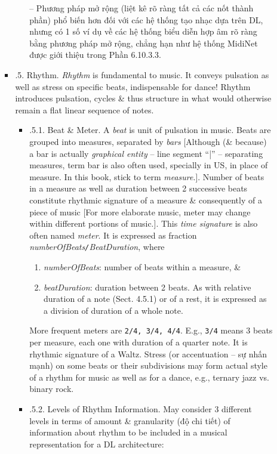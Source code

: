 \documentclass{article}
\begin{document}
\begin{itemize}
\begin{itemize}
\begin{itemize}
\begin{itemize}
				-- Phương pháp mở rộng (liệt kê rõ ràng tất cả các nốt thành phần) phổ biến hơn đối với các hệ thống tạo nhạc dựa trên DL, nhưng có 1 số ví dụ về các hệ thống biểu diễn hợp âm rõ ràng bằng phương pháp mở rộng, chẳng hạn như hệ thống MidiNet được giới thiệu trong Phần 6.10.3.3.
			\end{itemize}
			\item {.5. Rhythm.} {\it Rhythm} is fundamental to music. It conveys pulsation as well as stress on specific beats, indispensable for dance! Rhythm introduces pulsation, cycles \& thus structure in what would otherwise remain a flat linear sequence of notes.
			\begin{itemize}
				\item {.5.1. Beat \& Meter.} A {\it beat} is unit of pulsation in music. Beats are grouped into measures, separated by {\it bars} [Although (\& because) a bar is actually {\it graphical entity} -- line segment ``|'' -- separating measures, term bar is also often used, specially in US, in place of measure. In this book, stick to term {\it measure}.]. Number of beats in a measure as well as duration between 2 successive beats constitute rhythmic signature of a measure \& consequently of a piece of music [For more elaborate music, meter may change within different portions of music.]. This {\it time signature} is also often named {\it meter}. It is expressed as fraction {\it numberOfBeats{\tt/}BeatDuration}, where
				\begin{enumerate}
					\item {\it numberOfBeats}: number of beats within a measure, \&
					\item {\it beatDuration}: duration between 2 beats. As with relative duration of a note (Sect. 4.5.1) or of a rest, it is expressed as a division of duration of a whole note.
				\end{enumerate}
				More frequent meters are {\tt2/4, 3/4, 4/4}. E.g., {\tt3/4} means 3 beats per measure, each one with duration of a quarter note. It is rhythmic signature of a Waltz. Stress (or accentuation -- sự nhấn mạnh) on some beats or their subdivisions may form actual style of a rhythm for music as well as for a dance, e.g., ternary jazz vs. binary rock.
				\item {.5.2. Levels of Rhythm Information.} May consider 3 different levels in terms of amount \& granularity (độ chi tiết) of information about rhythm to be included in a musical representation for a DL architecture:
				\begin{enumerate}

\end{enumerate}
\end{itemize}
\end{itemize}
\end{itemize}
\end{itemize}
\end{document}

